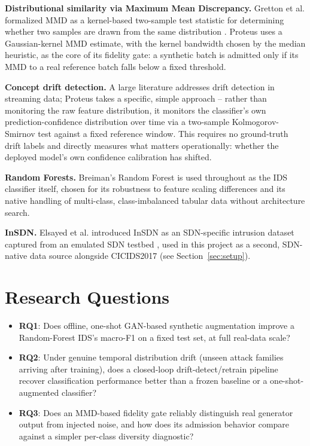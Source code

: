 \documentclass[conference]{IEEEtran}
\begin{document}
\textbf{Distributional similarity via Maximum Mean Discrepancy.} Gretton et al. formalized MMD
as a kernel-based two-sample test statistic for determining whether two samples are drawn from
the same distribution \cite{gretton2012}. Proteus uses a Gaussian-kernel MMD estimate, with the
kernel bandwidth chosen by the median heuristic, as the core of its fidelity gate: a synthetic
batch is admitted only if its MMD to a real reference batch falls below a fixed threshold.

\textbf{Concept drift detection.} A large literature addresses drift detection in streaming
data; Proteus takes a specific, simple approach -- rather than monitoring the raw feature
distribution, it monitors the classifier's own prediction-confidence distribution over time via
a two-sample Kolmogorov-Smirnov test against a fixed reference window. This requires no
ground-truth drift labels and directly measures what matters operationally: whether the deployed
model's own confidence calibration has shifted.

\textbf{Random Forests.} Breiman's Random Forest \cite{breiman2001} is used throughout as the
IDS classifier itself, chosen for its robustness to feature scaling differences and its native
handling of multi-class, class-imbalanced tabular data without architecture search.

\textbf{InSDN.} Elsayed et al. introduced InSDN as an SDN-specific intrusion dataset captured
from an emulated SDN testbed \cite{elsayed2020}, used in this project as a second, SDN-native
data source alongside CICIDS2017 (see Section~\ref{sec:setup}).

\section{Research Questions}

\begin{itemize}
  \item \textbf{RQ1}: Does offline, one-shot GAN-based synthetic augmentation improve a
    Random-Forest IDS's macro-F1 on a fixed test set, at full real-data scale?
  \item \textbf{RQ2}: Under genuine temporal distribution drift (unseen attack families arriving
    after training), does a closed-loop drift-detect/retrain pipeline recover classification
    performance better than a frozen baseline or a one-shot-augmented classifier?
  \item \textbf{RQ3}: Does an MMD-based fidelity gate reliably distinguish real generator output
    from injected noise, and how does its admission behavior compare against a simpler
    per-class diversity diagnostic?
\end{itemize}
\end{document}
